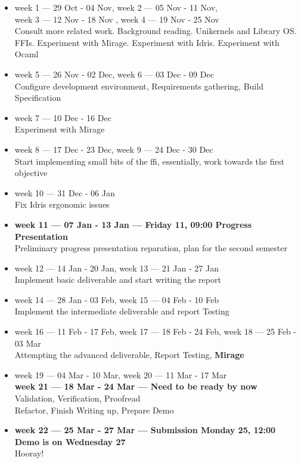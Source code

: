 \documentclass[a4paper]{report}
\begin{document}
\begin{itemize}

	\item week 1 --- 29 Oct - 04 Nov,
	      week 2 --- 05 Nov - 11 Nov, \\
	      week 3 --- 12 Nov - 18 Nov ,
	      week 4 --- 19 Nov - 25 Nov \\
	      Consult more related work.
	      Background reading.
	      Unikernels and Library OS. \\
	      FFIs.
	      Experiment with Mirage.
	      Experiment with Idris.
	      Experiment with Ocaml

	\item week 5 --- 26 Nov - 02 Dec,
	      week 6 --- 03 Dec - 09 Dec \\
	      Configure development environment,
	      Requirements gathering,
	      Build Specification
	\item week 7 --- 10 Dec - 16 Dec \\
	      Experiment with Mirage
	\item week 8 --- 17 Dec - 23 Dec,
	      week 9 --- 24 Dec - 30 Dec \\
	      Start implementing small bits
	      of the ffi, essentially,
	      work towards the first objective
	\item week 10 --- 31 Dec - 06 Jan \\ Fix Idris ergonomic issues
	\item \textbf{week 11 --- 07 Jan - 13 Jan ---
		      Friday 11, 09:00
		      Progress Presentation} \\ Preliminary progress presentation
	      reparation, plan for the second semester
	\item week 12 --- 14 Jan - 20 Jan,
	      week 13 --- 21 Jan - 27 Jan \\
	      Implement basic deliverable
	      and start writing
	      the report
	\item week 14 --- 28 Jan - 03 Feb,
	      week 15 --- 04 Feb - 10 Feb \\ Implement the intermediate
	      deliverable and report Testing
	\item week 16 --- 11 Feb - 17 Feb,
	      week 17 --- 18 Feb - 24 Feb,
	      week 18 --- 25 Feb - 03 Mar \\ Attempting the advanced
	      deliverable, Report Testing, \textbf{Mirage}
	\item week 19 --- 04 Mar - 10 Mar,
	      week 20 --- 11 Mar - 17 Mar \\
	      \textbf{week 21 --- 18 Mar - 24 Mar ---
		      Need to be ready by now} \\
	      Validation,
	      Verification,
	      Proofread \\
	      Refactor,
	      Finish Writing up,
	      Prepare Demo
	\item \textbf{week 22 --- 25 Mar - 27 Mar ---
		      Submission Monday 25, 12:00
		      Demo is on Wednesday 27} \\ Hooray!

\end{itemize}
\end{document}
